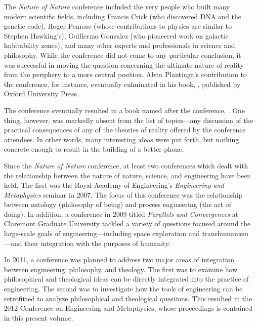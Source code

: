 The \textit{Nature of Nature} conference included the very people who built many modern scientific fields, including Francis Crick (who discovered DNA and the genetic code), Roger Penrose (whose contributions to physics are similar to Stephen Hawking's), Guillermo Gonzalez (who pioneered work on galactic habitability zones), and many other experts and professionals in science and philosophy.  While the conference did not come to any particular conclusion, it was successful in moving the question concerning the ultimate nature of reality from the periphery to a more central position.  Alvin Plantinga's contribution to the conference, for instance, eventually culminated in his book, , published by Oxford University Press \citep{plantinga2011, plantinga2011b}.

The conference eventually resulted in a book named after the conference,  \citep{natnat2011}.  One thing, however, was markedly absent from the list of topics---any discussion of the practical consequences of any of the theories of reality offered by the conference attendees. In other words, many interesting ideas were put forth, but nothing concrete enough to result in the building of a better phone.

Since the \textit{Nature of Nature} conference, at least two conferences which dealt with the relationship between the nature of nature, science, and engineering have been held.
The first was the Royal Academy of Engineering's \textit{Engineering and Metaphysics} seminar in 2007.  The focus of this conference was the relationship between ontology (philosophy of being) and process engineering (the act of doing).  In addition,  a conference in 2009 titled \textit{Parallels and Convergences} at Claremont Graduate University tackled a variety of questions focused around the large-scale goals of engineering---including space exploration and transhumanism---and their integration with the purposes of humanity.  

In 2011, a conference was planned to address two major areas of integration between engineering, philosophy, and theology.  The first was to examine how philosophical and theological ideas can be directly integrated into the practice of engineering.  The second was to investigate how the tools of engineering can be retrofitted to analyze philosophical and theological questions.  This resulted in the 2012 Conference on Engineering and Metaphysics, whose proceedings is contained in this present volume.

